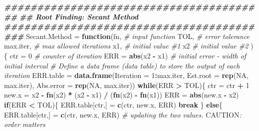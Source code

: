\documentclass[
]{book}
\newenvironment{Shaded}{\begin{snugshade}}{\end{snugshade}}
\newcommand{\AlertTok}[1]{\textcolor[rgb]{0.94,0.16,0.16}{#1}}
\newcommand{\AttributeTok}[1]{\textcolor[rgb]{0.13,0.29,0.53}{#1}}
\newcommand{\CommentTok}[1]{\textcolor[rgb]{0.56,0.35,0.01}{\textit{#1}}}
\newcommand{\ConstantTok}[1]{\textcolor[rgb]{0.56,0.35,0.01}{#1}}
\newcommand{\ControlFlowTok}[1]{\textcolor[rgb]{0.13,0.29,0.53}{\textbf{#1}}}
\newcommand{\DecValTok}[1]{\textcolor[rgb]{0.00,0.00,0.81}{#1}}
\newcommand{\DocumentationTok}[1]{\textcolor[rgb]{0.56,0.35,0.01}{\textbf{\textit{#1}}}}
\newcommand{\FunctionTok}[1]{\textcolor[rgb]{0.13,0.29,0.53}{\textbf{#1}}}
\newcommand{\NormalTok}[1]{#1}
\newcommand{\OtherTok}[1]{\textcolor[rgb]{0.56,0.35,0.01}{#1}}
\newcommand{\SpecialCharTok}[1]{\textcolor[rgb]{0.81,0.36,0.00}{\textbf{#1}}}
\begin{document}
\begin{Shaded}
\begin{Highlighting}[]
\DocumentationTok{\#\#\#\#\#\#\#\#\#\#\#\#\#\#\#\#\#\#\#\#\#\#\#\#\#\#\#\#\#\#\#\#\#\#\#\#\#\#\#\#}
\DocumentationTok{\#\#     Root Finding: Secant Method}
\DocumentationTok{\#\#\#\#\#\#\#\#\#\#\#\#\#\#\#\#\#\#\#\#\#\#\#\#\#\#\#\#\#\#\#\#\#\#\#\#\#\#\#\#\#}
\NormalTok{Secant.Method }\OtherTok{=} \ControlFlowTok{function}\NormalTok{(fn,            }\CommentTok{\# input function}
\NormalTok{                  TOL,                  }\CommentTok{\# error tolerance }
\NormalTok{                  max.iter,             }\CommentTok{\# max allowed iterations}
\NormalTok{                  x1,                   }\CommentTok{\# initial value \#1}
\NormalTok{                  x2                    }\CommentTok{\# initial value \#2}
\NormalTok{                  )\{}
\NormalTok{  ctr }\OtherTok{=} \DecValTok{0}                \CommentTok{\# counter of iteration}
\NormalTok{  ERR }\OtherTok{=} \FunctionTok{abs}\NormalTok{(x2 }\SpecialCharTok{{-}}\NormalTok{ x1)     }\CommentTok{\# initial error {-} width of initial interval}
  \CommentTok{\# Define a data frame (data table) to store the output of each iteration}
\NormalTok{  ERR.table }\OtherTok{=}  \FunctionTok{data.frame}\NormalTok{(}\AttributeTok{Iteration =} \DecValTok{1}\SpecialCharTok{:}\NormalTok{max.iter,   }
                          \AttributeTok{Est.root =} \FunctionTok{rep}\NormalTok{(}\ConstantTok{NA}\NormalTok{, max.iter),}
                          \AttributeTok{Abs.error =} \FunctionTok{rep}\NormalTok{(}\ConstantTok{NA}\NormalTok{, max.iter))}
  \ControlFlowTok{while}\NormalTok{(ERR }\SpecialCharTok{\textgreater{}}\NormalTok{ TOL)\{ }
\NormalTok{      ctr }\OtherTok{=}\NormalTok{ ctr }\SpecialCharTok{+} \DecValTok{1}
\NormalTok{      new.x }\OtherTok{=}\NormalTok{ x2 }\SpecialCharTok{{-}} \FunctionTok{fn}\NormalTok{(x2) }\SpecialCharTok{*}\NormalTok{ (x2 }\SpecialCharTok{{-}}\NormalTok{ x1) }\SpecialCharTok{/}\NormalTok{ (}\FunctionTok{fn}\NormalTok{(x2) }\SpecialCharTok{{-}} \FunctionTok{fn}\NormalTok{(x1))}
\NormalTok{      ERR }\OtherTok{=} \FunctionTok{abs}\NormalTok{(new.x }\SpecialCharTok{{-}}\NormalTok{ x2)}
      \ControlFlowTok{if}\NormalTok{(ERR }\SpecialCharTok{\textless{}}\NormalTok{ TOL)\{}
\NormalTok{         ERR.table[ctr,] }\OtherTok{=} \FunctionTok{c}\NormalTok{(ctr, new.x, ERR)}
         \ControlFlowTok{break}
\NormalTok{         \} }\ControlFlowTok{else}\NormalTok{\{}
\NormalTok{            ERR.table[ctr,] }\OtherTok{=} \FunctionTok{c}\NormalTok{(ctr, new.x, ERR)}
            \CommentTok{\# updating the two values. }\AlertTok{CAUTION}\CommentTok{: order matters}

\end{Highlighting}
\end{Shaded}
\end{document}
